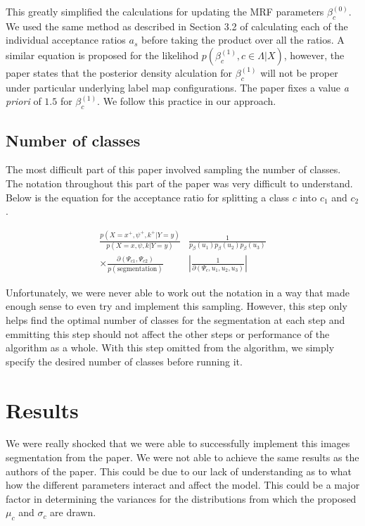 \documentclass[11pt]{article}
\begin{document}
This greatly simplified the calculations for updating the MRF parameters  $\beta_{c}^{(0)}$.
We used the same method as described in Section 3.2 of calculating each of the individual acceptance ratios $a_{s}$ before taking the product over all the ratios.
A similar equation is proposed for the likelihod $p(\beta_{c}^{(1)}, c \in \Lambda | X)$, however, the paper states that the posterior density alculation for $\beta_{c}^{(1)}$ will not be proper under particular underlying label map configurations.
The paper fixes a value \textit{a priori} of $1.5$ for $\beta_{c}^{(1)}$.
We follow this practice in our approach.

\subsection{Number of classes}
The most difficult part of this paper involved sampling the number of classes.
The notation throughout this part of the paper was very difficult to understand.
Below is the equation for the acceptance ratio for splitting a class $c$ into $c_{1}$ and $c_{2}$.

\begin{equation}
\begin{aligned}
\frac{p\left(X=x^{+}, \psi^{+}, k^{+} | Y=y\right)}{p(X=x, \psi, k | Y=y)} & \frac{1}{p_{\beta}\left(u_{1}\right) p_{\beta}\left(u_{2}\right) p_{\beta}\left(u_{3}\right)} \\
\times \frac{\partial\left(\Psi_{c 1}, \Psi_{c 2}\right)}{p(\text {segmentation})} &\left|\frac{1}{\partial\left(\Psi_{c}, u_{1}, u_{2}, u_{3}\right)}\right|
\end{aligned}
\end{equation}

Unfortunately, we were never able to work out the notation in a way that made enough sense to even try and implement this sampling.
However, this step only helps find the optimal number of classes for the segmentation at each step and emmitting this step should not affect the other steps or performance of the algorithm as a whole.
With this step omitted from the algorithm, we simply specify the desired number of classes before running it.

\section{Results}

We were really shocked that we were able to successfully implement this images segmentation from the paper.
We were not able to achieve the same results as the authors of the paper.
This could be due to our lack of understanding as to what how the different parameters interact and affect the model.
This could be a major factor in determining the variances for the distributions from which the proposed $\mu_{c}$ and $\sigma_{c}$ are drawn.
\end{document}
